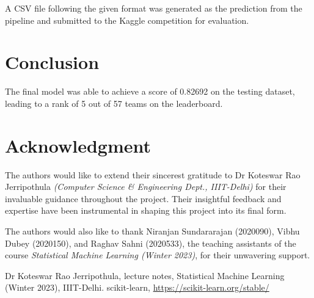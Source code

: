 \documentclass[conference]{IEEEtran}
\begin{document}
    A CSV file following the given format was generated as the prediction from the pipeline and submitted to the
    Kaggle competition for evaluation.

    \section{Conclusion}
    \label{sec:results}
    The final model was able to achieve a score of 0.82692 on the testing dataset, leading to a rank of 5 out of
    57 teams on the leaderboard.

    \section*{Acknowledgment}
    \label{sec:acknowledgment}
    The authors would like to extend their sincerest gratitude to Dr Koteswar Rao Jerripothula
    \textit{(Computer Science \& Engineering Dept., IIIT-Delhi)} for their invaluable guidance throughout the project.
    Their insightful feedback and expertise have been instrumental in shaping this project into its final form.

    The authors would also like to thank Niranjan Sundararajan (2020090), Vibhu Dubey (2020150), and Raghav Sahni (2020533),
    the teaching assistants of the course \textit{Statistical Machine Learning (Winter 2023)}, for their unwavering support.

    \begin{thebibliography}{00}
         Dr Koteswar Rao Jerripothula, lecture notes, Statistical Machine Learning (Winter 2023), IIIT-Delhi.
         scikit-learn, \underline{https://scikit-learn.org/stable/}
    \end{thebibliography}
\end{document}
